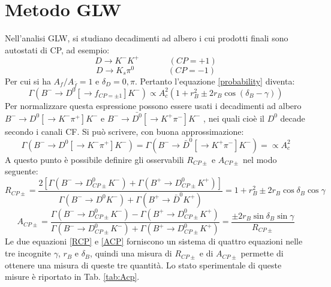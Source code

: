 \section{Metodo GLW}
\noindent
Nell'analisi GLW, si studiano decadimenti ad albero i cui prodotti finali sono autostati di CP, ad esempio:
\begin{equation}
 D\longrightarrow K^-K^+\ \ \ \ \ \ \ \ \ \ \ \ \ \ \ \ (CP = +1)
\end{equation}
\begin{equation}
 D\longrightarrow K_s\pi^0\ \ \ \ \ \ \ \ \ \ \ \ \ \ \ \ \ \ (CP = -1)
\end{equation}
Per cui si ha ${A_f}/A_{\bar{f}} = 1$ e $\delta_D = 0, \pi$. Pertanto l'equazione \eqref{probability} diventa:
\begin{equation}\label{numera}
 \Gamma(B^- \rightarrow D^0[\rightarrow f_{CP=\pm1}]K^-) \propto A_c^2 (1 + r_B^2 \pm 2r_B\cos(\delta_B - \gamma))
\end{equation}
Per normalizzare questa espressione possono essere usati i decadimenti ad albero $B^-\rightarrow D^0[\rightarrow K^{-}\pi^{+}] K^-$ e $B^-\rightarrow \bar{D^0}[\rightarrow K^{+}\pi^{-}] K^-$ 
, nei quali cioè il $D^0$ decade secondo i canali CF. Si può scrivere, con buona approssimazione:
\begin{equation}\label{normalizzazione}
 \Gamma(B^-\rightarrow D^0[\rightarrow K^-\pi^+]K^-) =  \Gamma(B^-\rightarrow \bar{D}^0[\rightarrow K^+\pi^-]K^-) = \propto A_c^2
\end{equation}
A questo punto è possibile definire gli osservabili $R_{CP\pm}$ e $A_{CP\pm}$ nel modo seguente:
\begin{equation}\label{RCP}
 R_{CP\pm} = \frac{2[\Gamma(B^- \rightarrow D_{CP\pm}^0K^-) + \Gamma(B^+\rightarrow D_{CP\pm}^0K^+)]}{\Gamma (B^-\rightarrow D^0K^-) + \Gamma (B^+ \rightarrow \bar{D}^0K^+)} = 1 + r_B^2 \pm 2r_B \cos \delta_B \cos \gamma
\end{equation}
\begin{equation}\label{ACP}
 A_{CP\pm} = \frac{\Gamma(B^- \rightarrow D_{CP\pm}^0K^-) - \Gamma(B^+\rightarrow D_{CP\pm}^0K^+)}{\Gamma(B^- \rightarrow D_{CP\pm}^0K^-) + \Gamma(B^+\rightarrow D_{CP\pm}^0K^+)} = \frac{\pm 2r_B\sin\delta_B\sin\gamma}{R_{CP\pm}}
\end{equation}
Le due equazioni \eqref{RCP} e \eqref{ACP} forniscono un sistema di quattro equazioni nelle tre incognite $\gamma$, $r_B$ e $\delta_B$, 
quindi una misura di $R_{CP\pm}$ e di $A_{CP\pm}$ permette di ottenere una misura di queste tre quantità. 
Lo stato sperimentale di queste misure è riportato in Tab. \ref{tab:Acp}.

